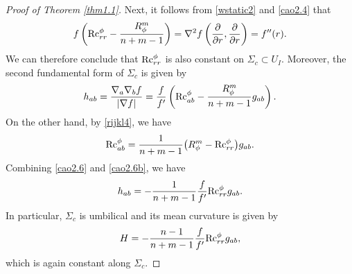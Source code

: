 \documentclass[pdftex]{sigma}
\numberwithin{equation}{section}
\begin{document}
\begin{proof}[Proof of Theorem \ref{thm1.1}]
Next, it follows from \eqref{wstatic2} and \eqref{cao2.4} that
\begin{equation}\label{cao2.4b}
 f\left({\rm Rc}^\phi_{rr}-\frac{R_\phi^m}{n+m-1}\right)=\nabla^2f\left(\frac{\partial}{\partial r},\frac{\partial}{\partial r}\right)=f''(r).
\end{equation}
We can therefore conclude that ${\rm Rc}^\phi_{rr}$ is also constant on $\Sigma_c\subset U_I$. Moreover, the second fundamental form of $\Sigma_c$ is given by
\begin{equation}\label{cao2.6}
 h_{ab}=\frac{\nabla_a\nabla_bf}{|\nabla f|}=\frac{f}{f'}\left({\rm Rc}^\phi_{ab}-\frac{R_\phi^m}{n+m-1}g_{ab}\right).
\end{equation}
On the other hand, by \eqref{rijkl4}, we have
\begin{equation}\label{cao2.6b}
 {\rm Rc}^\phi_{ab}=\frac{1}{n+m-1}\bigl(R_\phi^m-{\rm Rc}^\phi_{rr}\bigr)g_{ab}.
\end{equation}
Combining \eqref{cao2.6} and \eqref{cao2.6b}, we have
\begin{equation}\label{cao2.6c}
 h_{ab}=-\frac{1}{n+m-1}\frac{f}{f'}{\rm Rc}^\phi_{rr}g_{ab}.
\end{equation}
In particular, $\Sigma_c$ is umbilical and its mean curvature is given by
\begin{equation*}
 H=-\frac{n-1}{n+m-1}\frac{f}{f'}{\rm Rc}^\phi_{rr}g_{ab},
\end{equation*}
which is again constant along $\Sigma_c$.


\end{proof}
\end{document}
